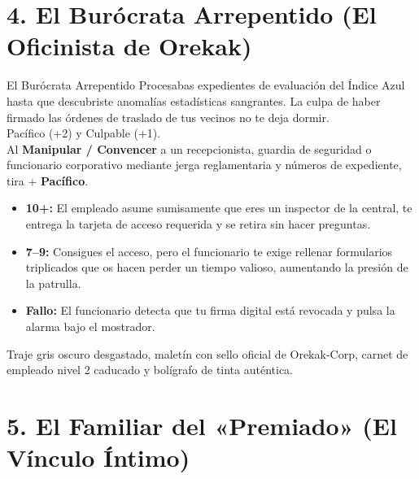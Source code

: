 \section{4. El Burócrata Arrepentido (El Oficinista de Orekak)}

\begin{FichaArquetipo}{El Burócrata Arrepentido}
Procesabas expedientes de evaluación del Índice Azul hasta que descubriste anomalías estadísticas sangrantes. La culpa de haber firmado las órdenes de traslado de tus vecinos no te deja dormir.\\
 Pacífico (+2) y Culpable (+1).\\
 Al \textbf{Manipular / Convencer} a un recepcionista, guardia de seguridad o funcionario corporativo mediante jerga reglamentaria y números de expediente, tira + \textbf{Pacífico}.
\begin{itemize}
  \item \textbf{10+:} El empleado asume sumisamente que eres un inspector de la central, te entrega la tarjeta de acceso requerida y se retira sin hacer preguntas.
  \item \textbf{7--9:} Consigues el acceso, pero el funcionario te exige rellenar formularios triplicados que os hacen perder un tiempo valioso, aumentando la presión de la patrulla.
  \item \textbf{Fallo:} El funcionario detecta que tu firma digital está revocada y pulsa la alarma bajo el mostrador.
\end{itemize}
 Traje gris oscuro desgastado, maletín con sello oficial de Orekak-Corp, carnet de empleado nivel 2 caducado y bolígrafo de tinta auténtica.
\end{FichaArquetipo}

\section{5. El Familiar del «Premiado» (El Vínculo Íntimo)}

